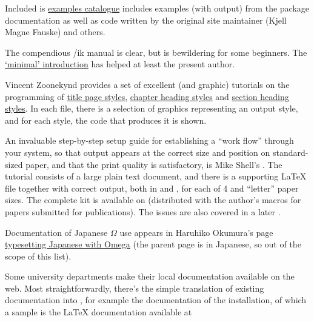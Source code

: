 Included is %
 \href{http://www.texample.net/tikz/examples/}{examples catalogue}
includes examples (with output) from the package documentation as well
as code written by the original site maintainer (Kjell Magne Fauske)
and others.

The compendious /ik manual is clear, but is
bewildering for some beginners.  The %
\href{http://cremeronline.com/LaTeX/minimaltikz.pdf}{`minimal' introduction}
has helped at least the present author.

Vincent Zoonekynd provides a set of excellent (and graphic) tutorials
on the programming of %
\href{http://zoonek.free.fr/LaTeX/LaTeX_samples_title/0.html}{title page styles},
\href{http://zoonek.free.fr/LaTeX/LaTeX_samples_chapter/0.html}{chapter heading styles}
and
\href{http://zoonek.free.fr/LaTeX/LaTeX_samples_section/0.html}{section heading styles}.
In each file, there is a selection of graphics representing an output
style, and for each style, the code that produces it is shown.

An invaluable step-by-step setup guide for establishing a ``work
flow'' through your \AllTeX{} system, so that output appears at the
correct size and position on standard-sized paper, and that the print
quality is satisfactory, is Mike Shell's .  The
tutorial consists of a large plain text document, and there is a
supporting \LaTeX{} file together with correct output, both in \PS{} and
, for each of 4 and ``letter'' paper sizes.  The
complete kit is available on  (distributed with the
author's macros for papers submitted for  publications).
The issues are also covered in a later %
.

Documentation of Japanese \ensuremath{\Omega{}} use appears in
Haruhiko Okumura's page
\href{http://oku.edu.mie-u.ac.jp/~okumura/texfaq/japanese/}{typesetting Japanese with Omega}
(the parent page is in Japanese, so out of the scope of this
 list).

Some university departments make their local documentation available
on the web.  Most straightforwardly, there's the simple translation of
existing documentation into , for example the 
documentation of the \AllTeX{} installation, of which a sample is the
\LaTeX{} documentation available at

